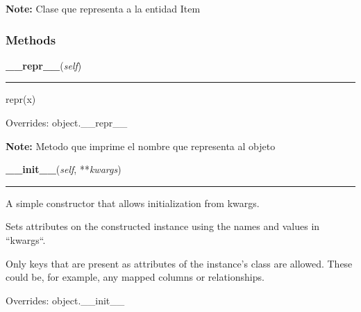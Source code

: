 \textbf{Note:} Clase que representa a la entidad Item





  \subsubsection{Methods}

    \vspace{0.5ex}

\hspace{.8\funcindent}\begin{boxedminipage}{\funcwidth}

    \raggedright \textbf{\_\_repr\_\_}(\textit{self})

    \vspace{-1.5ex}

    \rule{\textwidth}{0.5\fboxrule}
\setlength{\parskip}{2ex}
    repr(x)

\setlength{\parskip}{1ex}
      Overrides: object.\_\_repr\_\_

\textbf{Note:} Metodo que imprime el nombre que representa al objeto



    \end{boxedminipage}

    \vspace{0.5ex}

\hspace{.8\funcindent}\begin{boxedminipage}{\funcwidth}

    \raggedright \textbf{\_\_init\_\_}(\textit{self}, **\textit{kwargs})

    \vspace{-1.5ex}

    \rule{\textwidth}{0.5\fboxrule}
\setlength{\parskip}{2ex}
    A simple constructor that allows initialization from kwargs.

    Sets attributes on the constructed instance using the names and values 
    in ``kwargs``.

    Only keys that are present as attributes of the instance's class are 
    allowed. These could be, for example, any mapped columns or 
    relationships.

\setlength{\parskip}{1ex}
      Overrides: object.\_\_init\_\_

    \end{boxedminipage}


